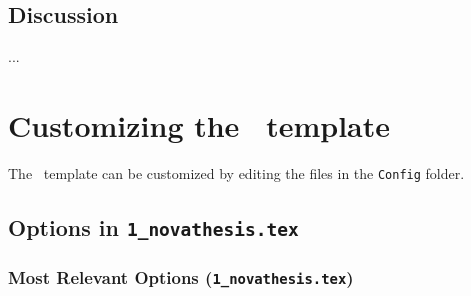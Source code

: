 \subsection{Discussion}
\label{sec:discussion_fl_apps_frameworks}

...




\section{Customizing the \novathesistxt\ template}
\label{sec:package_options}

The \novathesistxt\ template can be customized by editing the files in the \texttt{Config} folder.

\newcommand{\classoption}[4]{\textbf{#1=OPT}\newline\emph{\small#2}&\textbf{#3}\newline{\small#4}\\}
\newcommand{\defaultopt}[1]{\mbox{$\Rightarrow$~\emph{Default: \texttt{#1}}}\newline}
\newcommand{\defaultit}[1][default]{($\Leftarrow$~\emph{#1})}


\subsection{Options in \texttt{1\_novathesis.tex}} %
\label{sub:_texttt_1__novathesis_tex}

\subsubsection{Most Relevant Options (\texttt{1\_novathesis.tex})} %
\label{ssub:most_relevant_options}

